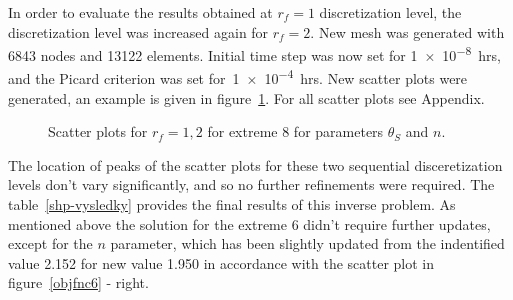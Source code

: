 \documentclass[review,times,3p,twocolumn,10pt]{elsarticle}
\begin{document}
In order to evaluate the results obtained at $r_f=1$ discretization level, the discretization level was increased again for $r_f=2$. New mesh was generated with 6843 nodes and 13122 elements. Initial time step was now set for \num{1e-8}~hrs, and the Picard criterion was set for~\num{1e-4}~hrs. New scatter plots were generated, an example is given in figure~\ref{ext6rf1-an2-example}. For all scatter plots see Appendix.


\begin{figure}[htb!]
\label{ext6rf1-an2-example}
\caption{Scatter plots for $r_f=1,2$ for extreme 8 for parameters $\theta_S$ and $n$.}
\end{figure}


The location of peaks of the scatter plots for these two sequential disceretization levels don't vary significantly, and so no further refinements were required. The table~\ref{shp-vysledky} provides the final results of this inverse problem. As mentioned above the solution for the extreme 6 didn't require further updates, except for  the $n$ parameter, which has been slightly updated from the indentified value 2.152 for new value 1.950 in accordance with the scatter plot in figure~\ref{objfnc6} - right.
\end{document}
